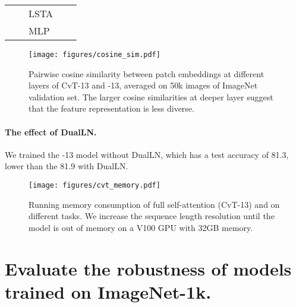 \begin{table}[]
\begin{tabular}{c|c|l|c|c}
                         &                              & \multirow{2}{*}{LSTA}     &                  &         \\
                         &                              &                          &                &               \\
                         &                              & MLP          &                                                                                                      &                                                                                                      \\ 
\hline
\end{tabular}
\end{table}





\begin{figure}
\begin{center}
    \texttt{[image: figures/cosine\_sim.pdf]}
\end{center}
\vspace{-1.5em}
\caption{ Pairwise cosine similarity between patch embeddings at different layers of CvT-13 and \cvtname{}-13, averaged on 50k images of ImageNet validation set. The larger cosine similarities at deeper layer suggest that the feature representation is less diverse.}
\label{fig:cos_sim}
\end{figure}




\paragraph{The effect of DualLN.} We trained the \cvtname{}-13 model without DualLN, which has a test accuracy of 81.3, lower than the 81.9 with DualLN.

\begin{figure}
\begin{center}
    \texttt{[image: figures/cvt\_memory.pdf]}
\end{center}
\caption{
Running memory consumption of full self-attention (CvT-13) and \name{} on different tasks. We increase the sequence length resolution until the model is out of memory on a V100 GPU with 32GB memory. 
}\label{fig:mem_time_cvt}
\end{figure}


\section{Evaluate the robustness of models trained on ImageNet-1k.}


